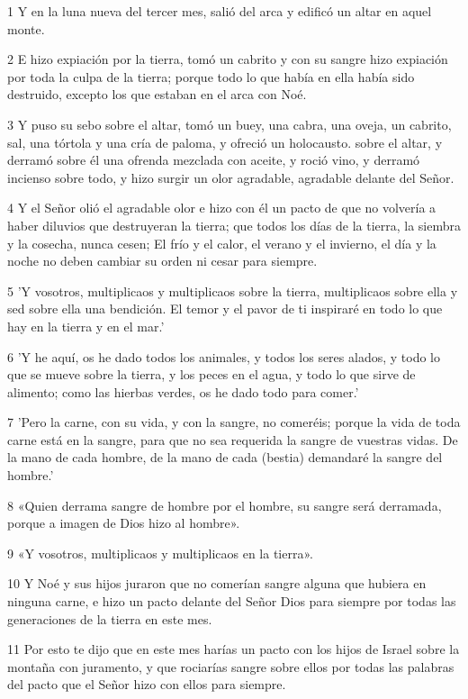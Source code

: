 \par 1 Y en la luna nueva del tercer mes, salió del arca y edificó un altar en aquel monte.
\par 2 E hizo expiación por la tierra, tomó un cabrito y con su sangre hizo expiación por toda la culpa de la tierra; porque todo lo que había en ella había sido destruido, excepto los que estaban en el arca con Noé.
\par 3 Y puso su sebo sobre el altar, tomó un buey, una cabra, una oveja, un cabrito, sal, una tórtola y una cría de paloma, y ​​ofreció un holocausto. sobre el altar, y derramó sobre él una ofrenda mezclada con aceite, y roció vino, y derramó incienso sobre todo, y hizo surgir un olor agradable, agradable delante del Señor.
\par 4 Y el Señor olió el agradable olor e hizo con él un pacto de que no volvería a haber diluvios que destruyeran la tierra; que todos los días de la tierra, la siembra y la cosecha, nunca cesen; El frío y el calor, el verano y el invierno, el día y la noche no deben cambiar su orden ni cesar para siempre.
\par 5 'Y vosotros, multiplicaos y multiplicaos sobre la tierra, multiplicaos sobre ella y sed sobre ella una bendición. El temor y el pavor de ti inspiraré en todo lo que hay en la tierra y en el mar.'
\par 6 'Y he aquí, os he dado todos los animales, y todos los seres alados, y todo lo que se mueve sobre la tierra, y los peces en el agua, y todo lo que sirve de alimento; como las hierbas verdes, os he dado todo para comer.'
\par 7 'Pero la carne, con su vida, y con la sangre, no comeréis; porque la vida de toda carne está en la sangre, para que no sea requerida la sangre de vuestras vidas. De la mano de cada hombre, de la mano de cada (bestia) demandaré la sangre del hombre.'
\par 8 «Quien derrama sangre de hombre por el hombre, su sangre será derramada, porque a imagen de Dios hizo al hombre».
\par 9 «Y vosotros, multiplicaos y multiplicaos en la tierra».
\par 10 Y Noé y sus hijos juraron que no comerían sangre alguna que hubiera en ninguna carne, e hizo un pacto delante del Señor Dios para siempre por todas las generaciones de la tierra en este mes.
\par 11 Por esto te dijo que en este mes harías un pacto con los hijos de Israel sobre la montaña con juramento, y que rociarías sangre sobre ellos por todas las palabras del pacto que el Señor hizo con ellos para siempre.
